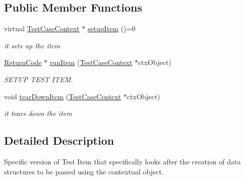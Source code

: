 \subsection*{Public Member Functions}
\begin{DoxyCompactItemize}
\item 
virtual \hyperlink{classit_1_1testbench_1_1data_1_1TestCaseContext}{Test\-Case\-Context} $\ast$ \hyperlink{classit_1_1testbench_1_1data_1_1SetupTestItem_ad26542d507924e860d5a2c7ea74367bb}{setup\-Item} ()=0
\begin{DoxyCompactList}\small\item\em it sets up the item \end{DoxyCompactList}\item 
\hyperlink{structit_1_1testbench_1_1data_1_1ReturnCode}{Return\-Code} $\ast$ \hyperlink{classit_1_1testbench_1_1data_1_1SetupTestItem_a67d9d8b7eb88da8e3523627a2238cafb}{run\-Item} (\hyperlink{classit_1_1testbench_1_1data_1_1TestCaseContext}{Test\-Case\-Context} $\ast$ctx\-Object)
\begin{DoxyCompactList}\small\item\em S\-E\-T\-U\-P T\-E\-S\-T I\-T\-E\-M. \end{DoxyCompactList}\item 
void \hyperlink{classit_1_1testbench_1_1data_1_1SetupTestItem_ab7a609d715ea55521984b81db042280f}{tear\-Down\-Item} (\hyperlink{classit_1_1testbench_1_1data_1_1TestCaseContext}{Test\-Case\-Context} $\ast$ctx\-Object)
\begin{DoxyCompactList}\small\item\em it tears down the item \end{DoxyCompactList}\end{DoxyCompactItemize}


\subsection{Detailed Description}
Specific version of Test Item that specifically looks after the creation of data structures to be passed using the contextual object. 

